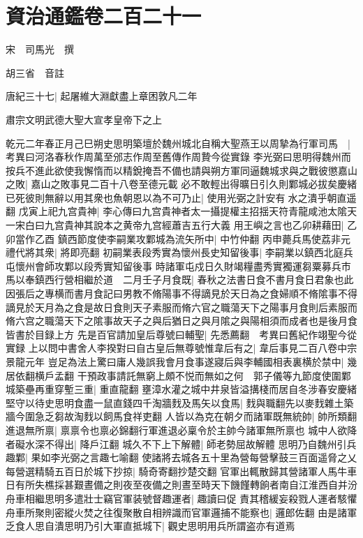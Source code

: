 \chapter{資治通鑑卷二百二十一}
宋　司馬光　撰

胡三省　音註

唐紀三十七|{
	起屠維大淵獻盡上章困敦凡二年}


肅宗文明武德大聖大宣孝皇帝下之上

乾元二年春正月己巳朔史思明築壇於魏州城北自稱大聖燕王以周摯為行軍司馬　|{
	考異曰河洛春秋作周萬至邠志作周至舊傳作周贄今從實錄}
李光弼曰思明得魏州而按兵不進此欲使我懈惰而以精銳掩吾不備也請與朔方軍同逼魏城求與之戰彼懲嘉山之敗|{
	嘉山之敗事見二百十八卷至德元載}
必不敢輕出得曠日引久則鄴城必拔矣慶緒已死彼則無辭以用其衆也魚朝恩以為不可乃止|{
	使用光弼之計安有水之潰乎朝直遥翻}
戊寅上祀九宫貴神|{
	李心傳曰九宫貴神者太一攝提權主招揺天符青龍咸池太隂天一宋白曰九宫貴神其說本之黄帝九宫經蕭吉五行大義}
用王嶼之言也乙卯耕藉田|{
	乙卯當作乙酉}
鎮西節度使李嗣業攻鄴城為流矢所中|{
	中竹仲翻}
丙申薨兵馬使荔非元禮代將其衆|{
	將即亮翻}
初嗣業表段秀實為懷州長史知留後事|{
	李嗣業以鎮西北庭兵屯懷州會師攻鄴以段秀實知留後事}
時諸軍屯戍日久財竭糧盡秀實獨運芻粟募兵市馬以奉鎮西行營相繼於道　二月壬子月食既|{
	春秋之法書日食不書月食日君象也此因張后之專横而書月食記曰男教不脩陽事不得謫見於天日為之食婦順不脩隂事不得謫見於天月為之食是故日食則天子素服而脩六官之職蕩天下之陽事月食則后素服而脩六宫之職蕩天下之隂事故天子之與后猶日之與月隂之與陽相須而成者也是後月食皆書於目録上方}
先是百官請加皇后尊號曰輔聖|{
	先悉薦翻　考異曰舊紀作翊聖今從實録}
上以問中書舍人李揆對曰自古皇后無尊號惟韋后有之|{
	韋后事見二百八卷中宗景龍元年}
豈足為法上驚曰庸人幾誤我會月食事遂寢后與李輔國相表裏横於禁中|{
	幾居依翻横戶孟翻}
干預政事請託無窮上頗不悦而無如之何　郭子儀等九節度使圍鄴城築壘再重穿塹三重|{
	重直龍翻}
壅漳水灌之城中井泉皆溢搆棧而居自冬涉春安慶緒堅守以待史思明食盡一鼠直錢四千淘牆䴰及馬矢以食馬|{
	䴰與職翻先以麥䴰雜土築牆今圍急乏芻故淘䴰以飼馬食祥吏翻}
人皆以為克在朝夕而諸軍既無統帥|{
	帥所類翻}
進退無所禀|{
	禀禀令也禀必錦翻行軍進退必稟令於主帥今諸軍無所禀也}
城中人欲降者礙水深不得出|{
	降戶江翻}
城久不下上下解體|{
	師老勢屈故解體}
思明乃自魏州引兵趣鄴|{
	果如李光弼之言趣七喻翻}
使諸將去城各五十里為營每營擊鼓三百面遥脅之乂每營選精騎五百日於城下抄掠|{
	騎奇寄翻抄楚交翻}
官軍出輒散歸其營諸軍人馬牛車日有所失樵採甚艱晝備之則夜至夜備之則晝至時天下饑饉轉餉者南自江淮西自并汾舟車相繼思明多遣壯士竊官軍装號督趣運者|{
	趣讀曰促}
責其稽緩妄殺戮人運者駭懼舟車所聚則密縱火焚之往復聚散自相辨識而官軍邏捕不能察也|{
	邏郎佐翻}
由是諸軍乏食人思自潰思明乃引大軍直抵城下|{
	觀史思明用兵所謂盗亦有道焉}
